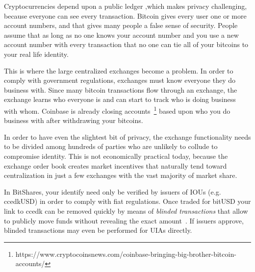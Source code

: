 Cryptocurrencies depend upon a public ledger ,which makes privacy challenging,
because everyone can see every transaction. Bitcoin gives every user one or
more account numbers, and that gives many people a false sense of security.
People assume that as long as no one knows your account number and you use a
new account number with every transaction that no one can tie all of your
bitcoins to your real life identity.

This is where the large centralized exchanges become a problem. In order to
comply with government regulations, exchanges must know everyone they do
business with. Since many bitcoin transactions flow through an exchange, the
exchange learns who everyone is and can start to track who is doing business
with whom. Coinbase is already closing
accounts~\footnote{https://www.cryptocoinsnews.com/coinbase-bringing-big-brother-bitcoin-accounts/}
based upon who you do business with after withdrawing your bitcoins.

In order to have even the slightest bit of privacy, the exchange functionality
needs to be divided among hundreds of parties who are unlikely to collude to
compromise identity. This is not economically practical today, because the
exchange order book creates market incentives that naturally tend toward
centralization in just a few exchanges with the vast majority of market share.

In BitShares, your identify need only be verified by issuers of IOUs (e.g.
ccedkUSD) in order to comply with fiat regulations. Once traded for bitUSD your
link to ccedk can be removed quickly by means of \emph{blinded transactions}
that allow to publicly move funds without revealing the exact
amount~\cite{}. If issuers approve, blinded transactions may even be performed
for UIAs directly.
